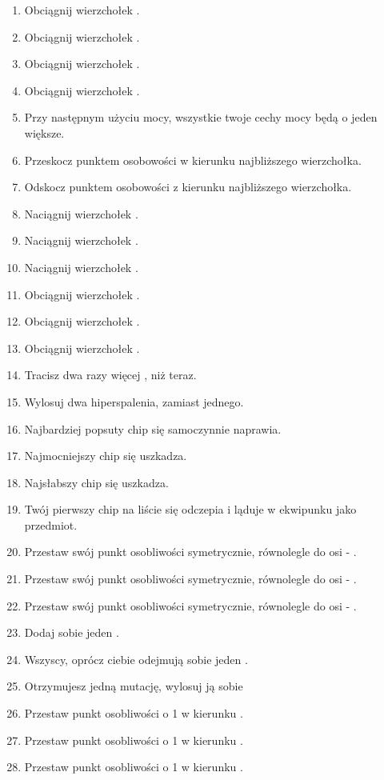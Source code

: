 \begin{enumerate}
	\item Obciągnij wierzchołek \abs{}.
	\item Obciągnij wierzchołek \abt{}.
	\item Obciągnij wierzchołek \abh{}.
	\item Obciągnij wierzchołek \abp{}.
	\item Przy następnym użyciu mocy, wszystkie twoje cechy mocy będą o jeden większe.
	\item Przeskocz punktem osobowości w kierunku najbliższego wierzchołka.
	\item Odskocz punktem osobowości z kierunku najbliższego wierzchołka.
	\item Naciągnij wierzchołek \absm{}.
	\item Naciągnij wierzchołek \abdm{}.
	\item Naciągnij wierzchołek \abrm{}.
	\item Obciągnij wierzchołek \absm{}.
	\item Obciągnij wierzchołek \abdm{}.
	\item Obciągnij wierzchołek \abrm{}.
	\item Tracisz dwa razy więcej \abkar{}, niż teraz.
	\item Wylosuj dwa hiperspalenia, zamiast jednego.
	\item Najbardziej popsuty chip się samoczynnie naprawia.
	\item Najmocniejszy chip się uszkadza.
	\item Najsłabszy chip się uszkadza.
	\item Twój pierwszy chip na liście się odczepia i ląduje w ekwipunku jako przedmiot.
	\item Przestaw swój punkt osobliwości symetrycznie, równolegle do osi \abh{} - \abt{}.
	\item Przestaw swój punkt osobliwości symetrycznie, równolegle do osi \abi{} - \abs{}.
	\item Przestaw swój punkt osobliwości symetrycznie, równolegle do osi \aba{} - \abp{}.
	\item Dodaj sobie jeden \abnkp{}.
	\item Wszyscy, oprócz ciebie odejmują sobie jeden \abnkp{}.
	\item Otrzymujesz jedną mutację, wylosuj ją sobie
	\item Przestaw punkt osobliwości o 1 w kierunku \abi{}.
	\item Przestaw punkt osobliwości o 1 w kierunku \abs{}.
	\item Przestaw punkt osobliwości o 1 w kierunku \abp{}.

\end{enumerate}

